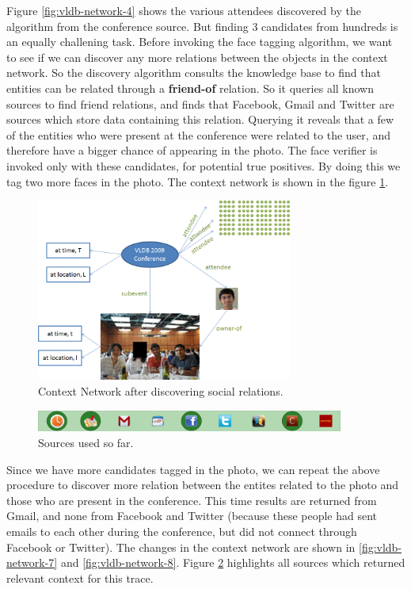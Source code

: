 Figure \ref{fig:vldb-network-4} shows the various attendees discovered by the algorithm from the conference source. But finding 3 candidates from hundreds is an equally challening task. Before invoking the face tagging algorithm, we want to see if we can discover any more relations between the objects in the context network. So the discovery algorithm consults the knowledge base to find that entities can be related through a \textbf{friend-of} relation. So it queries all known sources to find friend relations, and finds that Facebook, Gmail and Twitter are sources which store data containing this relation. Querying it reveals that a few of the entities who were present at the conference were related to the user, and therefore have a bigger chance of appearing in the photo. The face verifier is invoked only with these candidates, for potential true positives. By doing this we tag two more faces in the photo. The context network is shown in the figure \ref{fig:vldb-network-6}.

\begin{figure}[h]
\centering
\includegraphics[width=0.75\textwidth]{media/chapter4/stacktrace/vldb-network-6.png}
\caption{Context Network after discovering social relations.}
\label{fig:vldb-network-6}
\end{figure}
\begin{figure}[h]
\centering
\includegraphics[width=0.9\textwidth]{media/chapter4/stacktrace/vldb-source-2.png}
\caption{Sources used so far.}
\label{fig:vldb-network-3}
\end{figure}

Since we have more candidates tagged in the photo, we can repeat the above procedure to discover more relation between the entites related to the photo and those who are present in the conference. This time results are returned from Gmail, and none from Facebook and Twitter (because these people had sent emails to each other during the conference, but did not connect through Facebook or Twitter). The changes in the context network are shown in \ref{fig:vldb-network-7} and \ref{fig:vldb-network-8}. Figure \ref{fig:vldb-network-3} highlights all sources which returned relevant context for this trace. 


